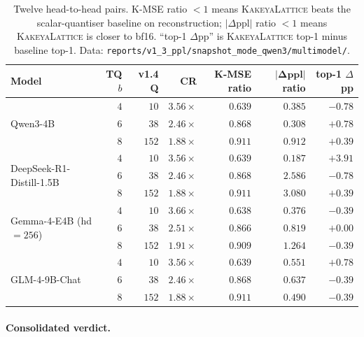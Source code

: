 \documentclass[11pt,a4paper]{article}
\theoremstyle{definition}
\theoremstyle{plain}
\newcommand{\abs}[1]{\left\lvert#1\right\rvert}
\begin{document}
\begin{table}[H]
\centering
\small
\caption{Twelve head-to-head pairs. K-MSE ratio $<\!1$ means
\textsc{KakeyaLattice} beats the scalar-quantiser baseline on
reconstruction; $\abs{\Delta\text{ppl}}$ ratio $<\!1$ means
\textsc{KakeyaLattice} is closer to bf16. ``top-1 $\Delta$pp'' is
\textsc{KakeyaLattice} top-1 minus baseline top-1. Data:
\texttt{reports/v1\_3\_ppl/snapshot\_mode\_qwen3/multimodel/}.}
\label{tab:multimodel}
\begin{tabular}{lrrrrrr}
  \toprule
  Model & TQ $b$ & v1.4 Q & CR & \textbf{K-MSE ratio} & $\boldsymbol{\abs{\Delta\text{ppl}}}$ \textbf{ratio} & \textbf{top-1 $\Delta$pp} \\
  \midrule
  \multirow{3}{*}{Qwen3-4B}
    & $4$ & $10$  & $3.56\times$ & $\mathbf{0.639}$ & $\mathbf{0.385}$ & $-0.78$ \\
    & $6$ & $38$  & $2.46\times$ & $\mathbf{0.868}$ & $\mathbf{0.308}$ & $+0.78$ \\
    & $8$ & $152$ & $1.88\times$ & $\mathbf{0.911}$ & $\mathbf{0.912}$ & $+0.39$ \\
  \midrule
  \multirow{3}{*}{DeepSeek-R1-Distill-1.5B}
    & $4$ & $10$  & $3.56\times$ & $\mathbf{0.639}$ & $\mathbf{0.187}$ & $+3.91$ \\
    & $6$ & $38$  & $2.46\times$ & $\mathbf{0.868}$ & $2.586$ & $-0.78$ \\
    & $8$ & $152$ & $1.88\times$ & $\mathbf{0.911}$ & $3.080$ & $+0.39$ \\
  \midrule
  \multirow{3}{*}{Gemma-4-E4B (hd $=\!256$)}
    & $4$ & $10$  & $3.66\times$ & $\mathbf{0.638}$ & $\mathbf{0.376}$ & $-0.39$ \\
    & $6$ & $38$  & $2.51\times$ & $\mathbf{0.866}$ & $\mathbf{0.819}$ & $+0.00$ \\
    & $8$ & $152$ & $1.91\times$ & $\mathbf{0.909}$ & $1.264$ & $-0.39$ \\
  \midrule
  \multirow{3}{*}{GLM-4-9B-Chat}
    & $4$ & $10$  & $3.56\times$ & $\mathbf{0.639}$ & $\mathbf{0.551}$ & $+0.78$ \\
    & $6$ & $38$  & $2.46\times$ & $\mathbf{0.868}$ & $\mathbf{0.637}$ & $-0.39$ \\
    & $8$ & $152$ & $1.88\times$ & $\mathbf{0.911}$ & $\mathbf{0.490}$ & $-0.39$ \\
  \bottomrule
\end{tabular}
\end{table}

\paragraph{Consolidated verdict.}
\end{document}
